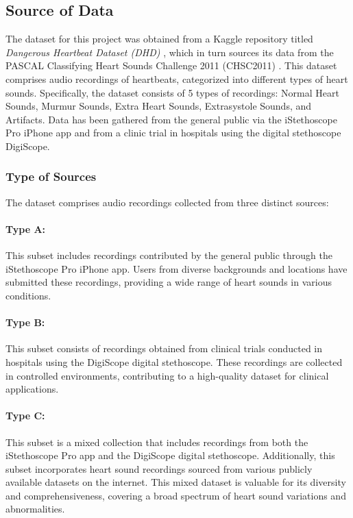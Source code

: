 \subsection{Source of Data}
The dataset for this project was obtained from a Kaggle repository titled \textit{Dangerous Heartbeat Dataset (DHD)} \cite{Dangerous-Heartbeat-Dataset-DHD},
which in turn sources its data from the PASCAL Classifying Heart Sounds Challenge 2011 (CHSC2011) \cite{pascal-chsc-2011}.
This dataset comprises audio recordings of heartbeats, categorized into different types of heart sounds.
Specifically, the dataset consists of 5 types of recordings: Normal Heart Sounds, Murmur Sounds, Extra Heart Sounds, Extrasystole Sounds, and Artifacts.
Data has been gathered from the general public via the iStethoscope Pro iPhone app and from a clinic trial in hospitals using the digital stethoscope DigiScope.

\subsubsection*{Type of Sources} %
The dataset comprises audio recordings collected from three distinct sources:
\paragraph{Type A:}
This subset includes recordings contributed by the general public through the iStethoscope Pro iPhone app.
Users from diverse backgrounds and locations have submitted these recordings, providing a wide range of heart sounds in various conditions.
\paragraph{Type B:}
This subset consists of recordings obtained from clinical trials conducted in hospitals using the DigiScope digital stethoscope.
These recordings are collected in controlled environments, contributing to a high-quality dataset for clinical applications.
\paragraph{Type C:}
This subset is a mixed collection that includes recordings from both the iStethoscope Pro app and the DigiScope digital stethoscope.
Additionally, this subset incorporates heart sound recordings sourced from various publicly available datasets on the internet.
This mixed dataset is valuable for its diversity and comprehensiveness, covering a broad spectrum of heart sound variations and abnormalities.

